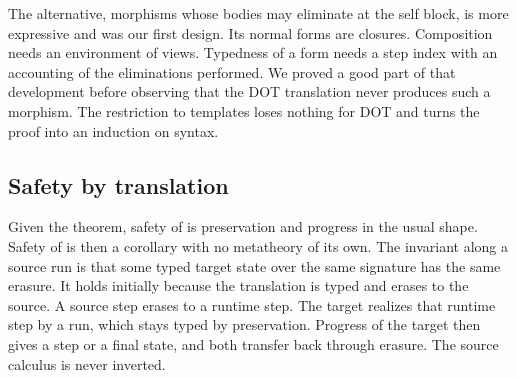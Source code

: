 The alternative, morphisms whose bodies may eliminate at the self block, is more expressive and was our first design. Its normal forms are closures. Composition needs an environment of views. Typedness of a form needs a step index with an accounting of the eliminations performed. We proved a good part of that development before observing that the DOT translation never produces such a morphism. The restriction to templates loses nothing for DOT and turns the proof into an induction on syntax.

\subsection{Safety by translation}

Given the theorem, safety of \FCdot is preservation and progress in the usual shape. Safety of \DOTMNF is then a corollary with no metatheory of its own. The invariant along a source run is that some typed target state over the same signature has the same erasure. It holds initially because the translation is typed and erases to the source. A source step erases to a runtime step. The target realizes that runtime step by a run, which stays typed by preservation. Progress of the target then gives a step or a final state, and both transfer back through erasure. The source calculus is never inverted.
